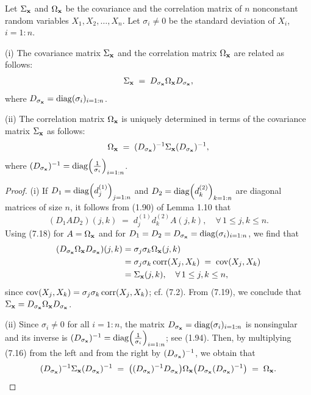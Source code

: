 
\begin{lemma}
Let $\Sigma_{\mathbf{x}}$ and $\Omega_{\mathbf{x}}$ be the covariance and the correlation matrix
of $n$ nonconstant random variables $X_1, X_2, \ldots, X_n$. Let $\sigma_i \neq 0$ be
the standard deviation of $X_i$, $i = 1:n$.

(i) The covariance matrix $\Sigma_{\mathbf{x}}$ and the correlation matrix $\Omega_{\mathbf{x}}$
are related as follows:
\begin{equation}
\Sigma_{\mathbf{x}} \;=\; D_{\sigma_{\mathbf{x}}}\Omega_{\mathbf{x}}D_{\sigma_{\mathbf{x}}},
\end{equation}
where $D_{\sigma_{\mathbf{x}}} = \operatorname{diag}(\sigma_i)_{i=1:n}$.

(ii) The correlation matrix $\Omega_{\mathbf{x}}$ is uniquely determined in terms of the
covariance matrix $\Sigma_{\mathbf{x}}$ as follows:
\begin{equation}
\Omega_{\mathbf{x}} \;=\; (D_{\sigma_{\mathbf{x}}})^{-1}\Sigma_{\mathbf{x}}(D_{\sigma_{\mathbf{x}}})^{-1},
\end{equation}
where $(D_{\sigma_{\mathbf{x}}})^{-1} = \operatorname{diag}\!\left(\frac{1}{\sigma_i}\right)_{i=1:n}$.
\end{lemma}

\begin{proof}
(i) If $D_1 = \operatorname{diag}\!\left(d_j^{(1)}\right)_{j=1:n}$ and $D_2 =
\operatorname{diag}\!\left(d_k^{(2)}\right)_{k=1:n}$ are diagonal matrices of size $n$, it follows
from (1.90) of Lemma 1.10 that
\begin{equation}
(D_1AD_2)(j,k) \;=\; d_j^{(1)}d_k^{(2)}A(j,k), \quad \forall\, 1\le j,k\le n.
\end{equation}
Using (7.18) for $A = \Omega_{\mathbf{x}}$ and for $D_1 = D_2 = D_{\sigma_{\mathbf{x}}} =
\operatorname{diag}(\sigma_i)_{i=1:n}$, we find that
\begin{align}
(D_{\sigma_{\mathbf{x}}}\Omega_{\mathbf{x}}D_{\sigma_{\mathbf{x}}})(j,k) &= \sigma_j\sigma_k\Omega_{\mathbf{x}}(j,k) \notag \\
&= \sigma_j\sigma_k\operatorname{corr}(X_j,X_k) \;=\; \operatorname{cov}(X_j,X_k) \notag \\
&= \Sigma_{\mathbf{x}}(j,k), \quad \forall\, 1\le j,k\le n,
\end{align}
since $\operatorname{cov}(X_j,X_k) = \sigma_j\sigma_k\operatorname{corr}(X_j,X_k)$; cf. (7.2). From (7.19), we
conclude that $\Sigma_{\mathbf{x}} = D_{\sigma_{\mathbf{x}}}\Omega_{\mathbf{x}}D_{\sigma_{\mathbf{x}}}$.

(ii) Since $\sigma_i \neq 0$ for all $i = 1:n$, the matrix $D_{\sigma_{\mathbf{x}}} =
\operatorname{diag}(\sigma_i)_{i=1:n}$ is nonsingular and its inverse is $(D_{\sigma_{\mathbf{x}}})^{-1} =
\operatorname{diag}\!\left(\frac{1}{\sigma_i}\right)_{i=1:n}$; see (1.94). Then, by multiplying
(7.16) from the left and from the right by $(D_{\sigma_{\mathbf{x}}})^{-1}$, we obtain that
\[
(D_{\sigma_{\mathbf{x}}})^{-1}\Sigma_{\mathbf{x}}(D_{\sigma_{\mathbf{x}}})^{-1}
\;=\; \big((D_{\sigma_{\mathbf{x}}})^{-1}D_{\sigma_{\mathbf{x}}}\big)\Omega_{\mathbf{x}}\big(D_{\sigma_{\mathbf{x}}}(D_{\sigma_{\mathbf{x}}})^{-1}\big)
\;=\; \Omega_{\mathbf{x}}.
\]
\end{proof}

